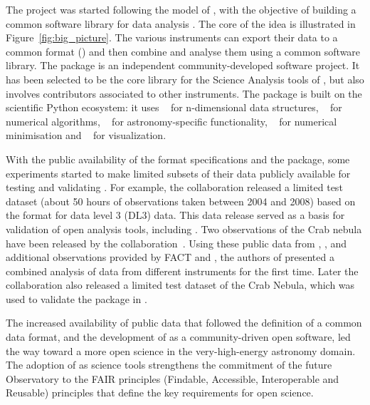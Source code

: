 \documentclass[longauth]{aa}
\begin{document}
The \gammapy project was started following the model of \astropy, with the objective of building a common
software library for \gammaray data analysis \citep{gammapy_2015}. 
The core of the idea is illustrated in Figure~\ref{fig:big_picture}. The various \gammaray instruments
can export their data to a common format (\gadf) and then combine and analyse
them using a common software library.
The \gammapy package is an independent community-developed software project.
It has been selected to be the core library for the Science Analysis tools of \cta,
but also involves contributors associated to other instruments.
The \gammapy package is built on the scientific Python ecosystem: it uses \numpy~\citep{numpy} for n-dimensional data
structures, \scipy~\citep{2020SciPy-NMeth} for numerical algorithms, \astropy~\citep{astropy} for
astronomy-specific functionality, \iminuit~\citep{iminuit} for numerical minimisation
and \matplotlib~\citep{matplotlib} for visualization.


With the public availability of the \gadf format specifications and the
\gammapy package, some experiments started to make limited subsets of
their \gammaray data publicly available for testing and validating
\gammapy. For example, the \hess collaboration released a limited test
dataset (about 50 hours of observations taken between 2004 and 2008)
based on the \gadf format \citep{HESS_DR1} for data level 3 (DL3) \gammaray data.
This data release served as a basis for validation of open analysis tools, including \gammapy 
\cite[see e.g.][]{Mohrmann2019}. Two observations of the Crab nebula have
been released by the \magic collaboration~\citep{magic_performance}.
Using these public data from \fermi, \hess, \magic and additional observations
provided by FACT and \veritas, the authors of \cite{joint_crab} presented
a combined analysis of \gammaray data from different instruments for the first time.
Later the \hawc collaboration also released a limited test dataset of the Crab Nebula,
which was used to validate the \gammapy package in \cite{Olivera2022}.


The increased availability of public data that followed the definition of
a common data format, and the development of \gammapy as a community-driven open software,
led the way toward a more open science in the very-high-energy \gammaray astronomy domain.
The adoption of \gammapy as science tools strengthens the commitment of the future \cta Observatory to the FAIR principles
(Findable, Accessible, Interoperable and Reusable) principles \citep{FAIR16, FAIR22} 
that define the key requirements for open science.
\end{document}
